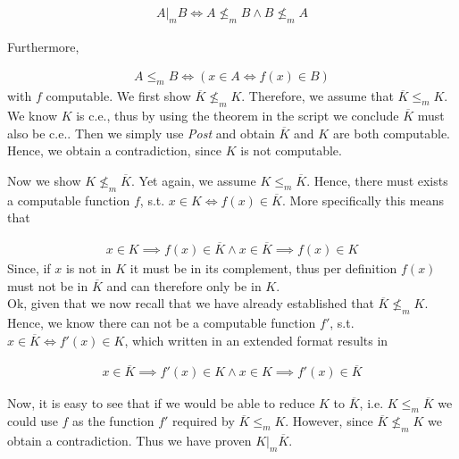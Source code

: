 \documentclass[11pt,a4paper]{article}
\begin{document}
\begin{equation*}
\begin{split}
A|_m B \iff A \nleq_mB \wedge B \nleq_m A
\end{split}
\end{equation*}

Furthermore,

\begin{equation*}
\begin{split}
A \leq_m B \iff (x \in A \iff f(x) \in B)
\end{split}
\end{equation*}
with $f$ computable.
We first show $\overline{K} \nleq_m K$. Therefore, we assume that $\overline{K} \leq_m K$.
We know $K$ is c.e., thus by using the theorem in the script we conclude $\overline{K}$ must also be c.e..
Then we simply use \emph{Post} and obtain $\overline{K}$  and $K$ are both computable. Hence, we obtain a contradiction,
since $K$ is not computable.


Now we show $ K \nleq_m \overline{K} $. Yet again, we assume $K \leq_m \overline{K}$. Hence, there must exists a
computable function $f$, s.t. $x \in K \iff f(x) \in \overline{K}$. More specifically this means that

\begin{equation*}
\begin{split}
x \in K  \implies f(x)\in \overline{K} \wedge x \in \overline{K}  \implies f(x) \in K
\end{split}
\end{equation*}
Since, if $x$ is not in $K$ it must be in its complement, thus per definition $f(x)$ must not be in $\overline{K}$ and can 
therefore only be in $K$.\\
Ok, given that we now recall that we have already established that $\overline{K} \nleq_m K$. Hence, we know there can not be a computable function $f'$, s.t. $x \in \overline{K} \iff f'(x) \in K$, which written in an extended format results in 

\begin{equation*}
\begin{split}
x \in \overline{K}  \implies f'(x)\in K \wedge x \in K  \implies f'(x) \in \overline{K}
\end{split}
\end{equation*}

Now, it is easy to see that if we would be able to reduce $K$ to $\overline{K}$, i.e. $K \leq_m \overline{K}$ we could use 
$f$ as the function $f'$ required by  $\overline{K} \leq_m K$. However, since $\overline{K} \nleq_m K$ we obtain a contradiction.
Thus we have proven $K|_m \overline{K}$.
\end{document}

